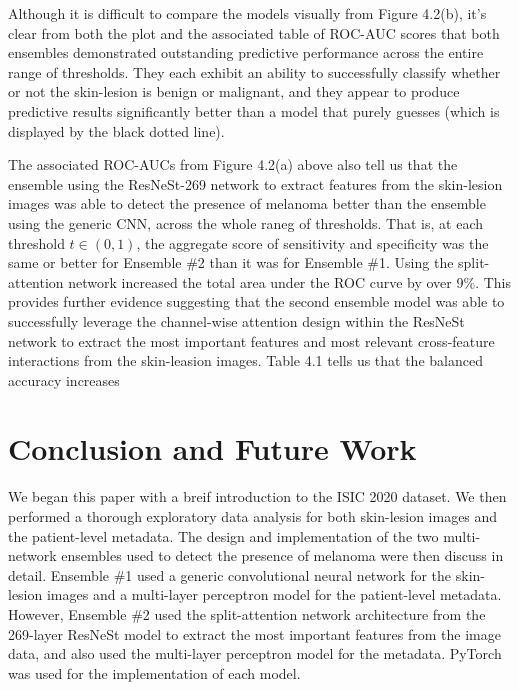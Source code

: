 \documentclass [MAS] {uclathes}
\begin{document}
Although it is difficult to compare the models visually from Figure 4.2(b), it's clear from both the plot and the associated table of ROC-AUC scores that both ensembles demonstrated outstanding predictive performance across the entire range of thresholds. They each exhibit an ability to successfully classify whether or not the skin-lesion is benign or malignant, and they appear to produce predictive results significantly better than a model that purely guesses (which is displayed by the black dotted line).

The associated ROC-AUCs from Figure 4.2(a) above also tell us that the ensemble using the ResNeSt-269 network to extract features from the skin-lesion images was able to detect the presence of melanoma better than the ensemble using the generic CNN, across the whole raneg of thresholds. That is, at each threshold $t \in (0, 1)$, the aggregate score of sensitivity and specificity was the same or better for Ensemble \#2 than it was for Ensemble \#1. Using the split-attention network increased the total area under the ROC curve by over 9\%. This provides further evidence suggesting that the second ensemble model was able to successfully leverage the channel-wise attention design within the ResNeSt network to extract the most important features and most relevant cross-feature interactions from the skin-leasion images. Table 4.1 tells us that the balanced accuracy increases 

\chapter{Conclusion and Future Work}

We began this paper with a breif introduction to the ISIC 2020 dataset. We then performed a thorough exploratory data analysis for both skin-lesion images and the patient-level metadata. The design and implementation of the two multi-network ensembles used to detect the presence of melanoma were then discuss in detail. Ensemble \#1 used a generic convolutional neural network for the skin-lesion images and a multi-layer perceptron model for the patient-level metadata. However, Ensemble \#2 used the split-attention network architecture from the 269-layer ResNeSt model to extract the most important features from the image data, and also used the multi-layer perceptron model for the metadata. PyTorch was used for the implementation of each model.
\end{document}
